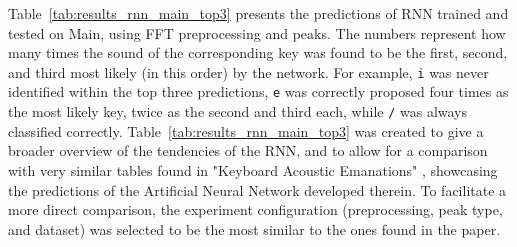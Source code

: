 \documentclass[../main.tex]{subfiles}
\begin{document}
Table~\ref{tab:results_rnn_main_top3} presents the predictions of RNN trained and tested on Main, using FFT preprocessing and  peaks. The numbers represent how many times the sound of the corresponding key was found to be the first, second, and third most likely (in this order) by the network. For example, \verb|i| was never identified within the top three predictions, \verb|e| was correctly proposed four times as the most likely key, twice as the second and third each, while \verb|/| was always classified correctly. Table~\ref{tab:results_rnn_main_top3} was created to give a broader overview of the tendencies of the RNN, and to allow for a comparison with very similar tables found in "Keyboard Acoustic Emanations" \cite{og2004}, showcasing the predictions of the Artificial Neural Network developed therein. To facilitate a more direct comparison, the experiment configuration (preprocessing, peak type, and dataset) was selected to be the most similar to the ones found in the paper. 
\end{document}
